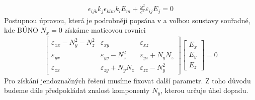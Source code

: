 \begin{eqnarray}
\epsilon_{ijk}k_j\epsilon_{klm}k_lE_m+\frac{\omega^2}{c^2}\varepsilon_{ij}E_j =0
\end{eqnarray}
Postupnou úpravou, která je podrobněji popsána v \cite{Nyvlt} a volbou soustavy souřadné, kde BÚNO $N_x=0$ získáme maticovou rovnici
\begin{eqnarray}
\begin{bmatrix}
\varepsilon_{xx}-N_y^2-N_z^2& \varepsilon_{xy}& \varepsilon_{xz} \\
\varepsilon_{yx}&   \varepsilon_{yy}-N_z^2& \varepsilon_{yz}+N_yN_z\\
\varepsilon_{zx}&   \varepsilon_{zy}+N_yN_z& \varepsilon_{zz}-N_y^2
\end{bmatrix}
\begin{bmatrix}
E_x\\ E_y\\ E_z
\end{bmatrix} = 0
\label{Matic1}
\end{eqnarray}
Pro získání jendoznačných řešení musíme fixovat další parametr. Z toho důvodu budeme dále předpokládat znalost komponenty $N_y$, kterou určuje úhel dopadu.

